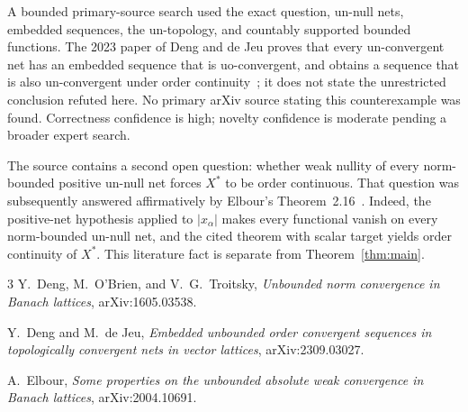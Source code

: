 \documentclass[11pt,a4paper]{article}
\begin{document}
A bounded primary-source search used the exact question, un-null nets,
embedded sequences, the un-topology, and countably supported bounded
functions.  The 2023 paper of Deng and de Jeu proves that every un-convergent
net has an embedded sequence that is uo-convergent, and obtains a sequence
that is also un-convergent under order continuity~\cite{DJ}; it does not
state the unrestricted conclusion refuted here.  No primary arXiv source
stating this counterexample was found.  Correctness confidence is high;
novelty confidence is moderate pending a broader expert search.

The source contains a second open question: whether weak nullity of every
norm-bounded positive un-null net forces $X^*$ to be order continuous.  That
question was subsequently answered affirmatively by Elbour's
Theorem~2.16~\cite{Elbour}.  Indeed, the positive-net hypothesis applied to
$|x_\alpha|$ makes every functional vanish on every norm-bounded un-null net,
and the cited theorem with scalar target yields order continuity of $X^*$.
This literature fact is separate from Theorem~\ref{thm:main}.

\begin{thebibliography}{3}
Y.~Deng, M.~O'Brien, and V.~G.~Troitsky,
\emph{Unbounded norm convergence in Banach lattices}, arXiv:1605.03538.

Y.~Deng and M.~de Jeu,
\emph{Embedded unbounded order convergent sequences in topologically
convergent nets in vector lattices}, arXiv:2309.03027.

A.~Elbour,
\emph{Some properties on the unbounded absolute weak convergence in Banach
lattices}, arXiv:2004.10691.
\end{thebibliography}
\end{document}

